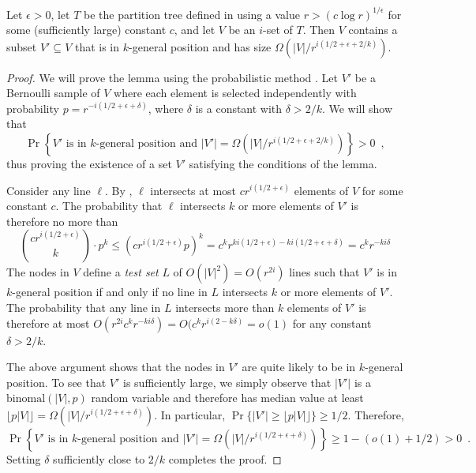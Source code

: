\documentclass{patmorin}
\begin{document}
\begin{lem}
  Let $\epsilon > 0$, let $T$ be the partition tree defined in
   using a value $r>(c\log r)^{1/\epsilon}$ for
  some (sufficiently large) constant $c$, and let $V$ be an $i$-set of
  $T$.  Then $V$ contains a subset $V'\subseteq V$ that is in $k$-general
  position and has size $\Omega(|V|/r^{i(1/2+\epsilon + 2/k)})$.
\end{lem}

\begin{proof}
  We will prove the lemma using the probabilistic method \cite{as08}.
  Let $V'$ be a Bernoulli sample of $V$ where each element is selected
  independently with probability $p=r^{-i(1/2+\epsilon+\delta)}$, where $\delta$ is a constant with $\delta > 2/k$.
  We will show that
  \[
     \Pr\left\{
        \mbox{$V'$ is in $k$-general position 
          and $|V'|=\Omega(|V|/r^{i(1/2+\epsilon+2/k)})$}
      \right\} > 0 \enspace ,
  \]
  thus proving the existence of a set $V'$ satisfying the conditions of
  the lemma.

  Consider any line $\ell$. By , $\ell$
  intersects at most $cr^{i(1/2+\epsilon)}$ elements of $V$ for some
  constant $c$. The probability that $\ell$ intersects $k$ or more
  elements of $V'$ is therefore no more than
  \[
    \binom{cr^{i(1/2+\epsilon)}}{k}\cdot p^k
    \le (cr^{i(1/2+\epsilon)}p)^k
    = c^kr^{ki(1/2+\epsilon)-ki(1/2+\epsilon+\delta)}
    = c^kr^{-ki\delta}
  \]
  The nodes in $V$ define a \emph{test set} $L$ of $O(|V|^2)=O(r^{2i})$
  lines such that $V'$ is in $k$-general position if and only if no line
  in $L$ intersects $k$ or more elements of $V'$.   The probability that
  any line in $L$ intersects more than $k$ elements of $V'$ is therefore
  at most $O(r^{2i}c^kr^{-ki\delta})=O(c^kr^{i(2-k\delta)}=o(1)$ for any
  constant $\delta > 2/k$.

  The above argument shows that the nodes in $V'$ are quite likely
  to be in $k$-general position.  To see that $V'$ is sufficiently
  large, we simply observe that $|V'|$ is a $\mathrm{binomal}(|V|,p)$
  random variable and therefore has median value at least
  $\lfloor{p|V|}\rfloor=\Omega(|V|/r^{i(1/2+\epsilon + \delta)})$.
  In particular, $\Pr\{|V'|\ge \lfloor{p|V|}\rfloor\}\ge 1/2$.  Therefore,
  \[
     \Pr\left\{
        \mbox{$V'$ is in $k$-general position 
          and $|V'|=\Omega(|V|/r^{i(1/2+\epsilon+\delta)})$}
      \right\} \ge 1- (o(1) + 1/2) > 0 \enspace .
  \]
  Setting $\delta$ sufficiently close to $2/k$ completes the proof.
\end{proof}
\end{document}
